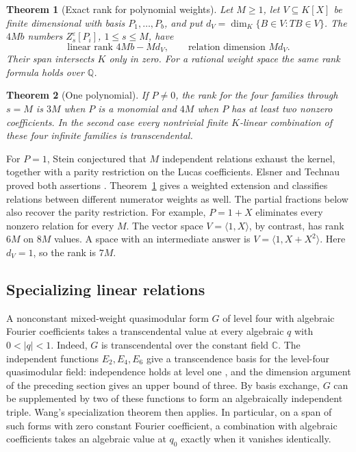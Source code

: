 \documentclass[11pt]{article}
\newtheorem{theorem}{Theorem}
\newcommand{\QQ}{\mathbb Q}
\newcommand{\CC}{\mathbb C}
\begin{document}
\begin{theorem}[Exact rank for polynomial weights]\label{rank}
Let $M\ge1$, let $V\subseteq K[X]$ be finite dimensional with basis $P_1,\ldots,P_b$, and put $d_V=\dim_K\{B\in V:TB\in V\}$. The $4Mb$ numbers $Z_s^\varepsilon[P_i]$, $1\le s\le M$, have
\[
 \boxed{\quad\text{linear rank }4Mb-Md_V,\qquad
                 \text{relation dimension }Md_V.\quad}
\]
Their span intersects $K$ only in zero. For a rational weight space the same rank formula holds over $\QQ$.
\end{theorem}
\begin{theorem}[One polynomial]\label{dich}
If $P\ne0$, the rank for the four families through $s=M$ is $3M$ when $P$ is a monomial and $4M$ when $P$ has at least two nonzero coefficients. In the second case every nontrivial finite $K$-linear combination of these four infinite families is transcendental.
\end{theorem}
For $P=1$, Stein conjectured that $M$ independent relations exhaust the kernel, together with a parity restriction on the Lucas coefficients. Elsner and Technau proved both assertions \cite[Conjecture and Theorem 1.1]{ET}. Theorem~\ref{rank} gives a weighted extension and classifies relations between different numerator weights as well. The partial fractions below also recover the parity restriction. For example, $P=1+X$ eliminates every nonzero relation for every $M$. The vector space $V=\langle 1,X\rangle$, by contrast, has rank $6M$ on $8M$ values. A space with an intermediate answer is $V=\langle1, X+X^2\rangle$. Here $d_V=1$, so the rank is $7M$.

\subsection*{Specializing linear relations}
A nonconstant mixed-weight quasimodular form $G$ of level four with algebraic Fourier coefficients takes a transcendental value at every algebraic $q$ with $0<|q|<1$. Indeed, $G$ is transcendental over the constant field $\CC$. The independent functions $E_2,E_4,E_6$ give a transcendence basis for the level-four quasimodular field: independence holds at level one \cite{NSZ}, and the dimension argument of the preceding section gives an upper bound of three. By basis exchange, $G$ can be supplemented by two of these functions to form an algebraically independent triple. Wang's specialization theorem then applies. In particular, on a span of such forms with zero constant Fourier coefficient, a combination with algebraic coefficients takes an algebraic value at $q_0$ exactly when it vanishes identically.
\end{document}
